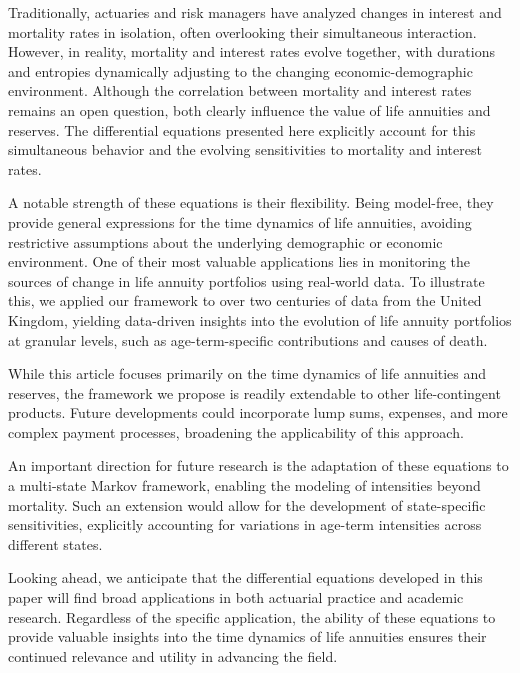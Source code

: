 \documentclass[12pt]{article}
\begin{document}
{Traditionally, actuaries and risk managers have analyzed changes in interest and mortality rates in isolation, often overlooking their simultaneous interaction. However, in reality, mortality and interest rates evolve together, with durations and entropies dynamically adjusting to the changing economic-demographic environment. Although the correlation between mortality and interest rates remains an open question, both clearly influence the value of life annuities and reserves. The differential equations presented here explicitly account for this simultaneous behavior and the evolving sensitivities to mortality and interest rates.

A notable strength of these equations is their flexibility. Being model-free, they provide general expressions for the time dynamics of life annuities, avoiding restrictive assumptions about the underlying demographic or economic environment. One of their most valuable applications lies in monitoring the sources of change in life annuity portfolios using real-world data. To illustrate this, we applied our framework to over two centuries of data from the United Kingdom, yielding data-driven insights into the evolution of life annuity portfolios at granular levels, such as age-term-specific contributions and causes of death.


While this article focuses primarily on the time dynamics of life annuities and reserves, the framework we propose is readily extendable to other life-contingent products. Future developments could incorporate lump sums, expenses, and more complex payment processes, broadening the applicability of this approach.

An important direction for future research is the adaptation of these equations to a multi-state Markov framework, enabling the modeling of intensities beyond mortality. Such an extension would allow for the development of state-specific sensitivities, explicitly accounting for variations in age-term intensities across different states.

Looking ahead, we anticipate that the differential equations developed in this paper will find broad applications in both actuarial practice and academic research. Regardless of the specific application, the ability of these equations to provide valuable insights into the time dynamics of life annuities ensures their continued relevance and utility in advancing the field.

\newpage


%
%

}
\end{document}
